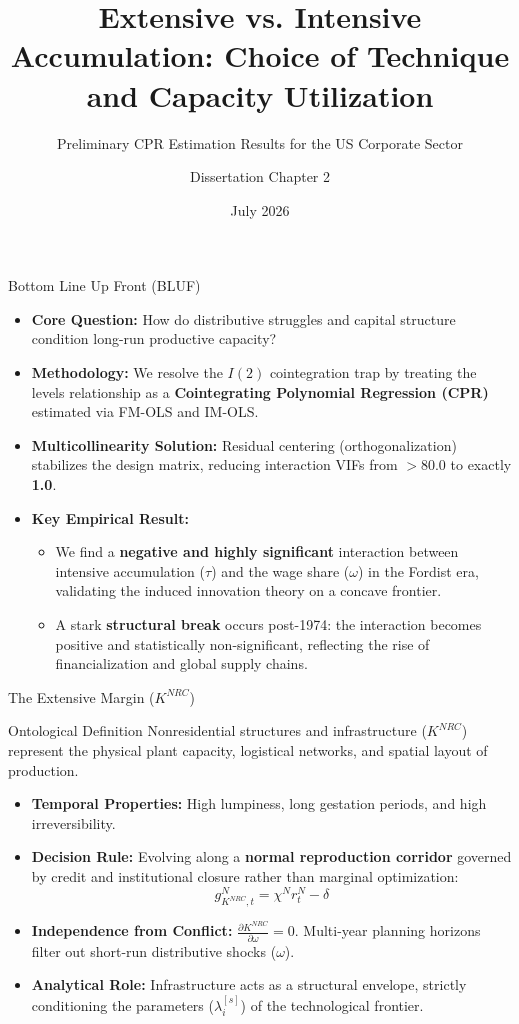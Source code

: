 \documentclass[10pt]{beamer}
\title[Extensive vs. Intensive Accumulation]{Extensive vs. Intensive Accumulation: Choice of Technique and Capacity Utilization}
\subtitle{Preliminary CPR Estimation Results for the US Corporate Sector}
\author{Dissertation Chapter 2}
\institute[UMass Amherst]{Department of Economics \\ University of Massachusetts Amherst}
\date{July 2026}
\begin{document}
\begin{frame}
  \titlepage
\end{frame}

\begin{frame}{Bottom Line Up Front (BLUF)}
  \begin{itemize}
    \item \textbf{Core Question:} How do distributive struggles and capital structure condition long-run productive capacity?
    \item \textbf{Methodology:} We resolve the $I(2)$ cointegration trap by treating the levels relationship as a \textbf{Cointegrating Polynomial Regression (CPR)} estimated via FM-OLS and IM-OLS. 
    \item \textbf{Multicollinearity Solution:} Residual centering (orthogonalization) stabilizes the design matrix, reducing interaction VIFs from $>80.0$ to exactly \textbf{1.0}.
    \item \textbf{Key Empirical Result:} 
      \begin{itemize}
        \item We find a \textbf{negative and highly significant} interaction between intensive accumulation ($\tau$) and the wage share ($\omega$) in the Fordist era, validating the induced innovation theory on a concave frontier.
        \item A stark \textbf{structural break} occurs post-1974: the interaction becomes positive and statistically non-significant, reflecting the rise of financialization and global supply chains.
      \end{itemize}
  \end{itemize}
\end{frame}

\begin{frame}{The Extensive Margin ($K^{NRC}$)}
  \begin{block}{Ontological Definition}
    Nonresidential structures and infrastructure ($K^{NRC}$) represent the physical plant capacity, logistical networks, and spatial layout of production.
  \end{block}
  \begin{itemize}
    \item \textbf{Temporal Properties:} High lumpiness, long gestation periods, and high irreversibility.
    \item \textbf{Decision Rule:} Evolving along a \textbf{normal reproduction corridor} governed by credit and institutional closure rather than marginal optimization:
      $$g_{K^{NRC}, t}^N = \chi^N r^N_t - \delta$$
    \item \textbf{Independence from Conflict:} $\frac{\partial K^{NRC}}{\partial \omega} = 0$. Multi-year planning horizons filter out short-run distributive shocks ($\omega$).
    \item \textbf{Analytical Role:} Infrastructure acts as a structural envelope, strictly conditioning the parameters ($\lambda_i^{[s]}$) of the technological frontier.
  \end{itemize}
\end{frame}
\end{document}
